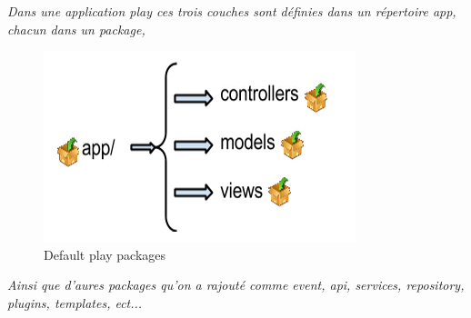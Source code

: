 \textit{Dans une application play ces trois couches sont définies dans un répertoire app, chacun dans un package,}
\begin{figure}[H]
        \centering
                \centering
                \includegraphics[width=\textwidth]{packages_play.png}
                \caption{Default play packages}
                \label{fig:Default play packages}
       
\end{figure}
\textit{Ainsi que d'aures packages qu'on a rajouté comme event, api, services, repository, plugins, templates, ect...}

